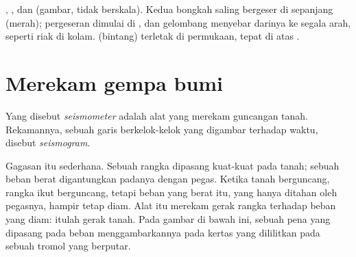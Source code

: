 \begin{omfigure}
{\small {}, , dan  (gambar, tidak berskala). Kedua
bongkah saling bergeser di sepanjang  (merah); pergeseran dimulai di
, dan gelombang menyebar darinya ke segala arah, seperti riak di
kolam.  (bintang) terletak di permukaan, tepat di atas
.}
\label{fig:g7:earthquakes:fault}
\end{omfigure}


\section{Merekam gempa bumi}

\begin{definition}\label{def:g7:earthquakes:seismometer}
Yang disebut \emph{seismometer} adalah alat yang merekam
guncangan tanah. Rekamannya, sebuah garis berkelok-kelok yang digambar
terhadap waktu, disebut \emph{seismogram}.
\end{definition}

Gagasan  itu sederhana. Sebuah rangka dipasang kuat-kuat pada
tanah; sebuah beban berat digantungkan padanya dengan pegas. Ketika tanah
berguncang, rangka ikut berguncang, tetapi beban yang berat itu, yang hanya
ditahan oleh pegasnya, hampir tetap diam. Alat itu merekam gerak rangka
terhadap beban yang diam: itulah gerak tanah. Pada gambar di bawah ini,
sebuah pena yang dipasang pada beban menggambarkannya pada kertas yang
dililitkan pada sebuah tromol yang berputar.

